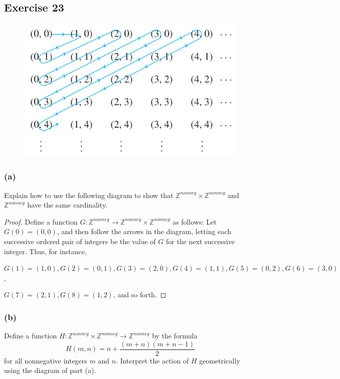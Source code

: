 \documentclass[14pt]{extarticle}
\newcommand{\Z}{\mathbb{Z}}
\begin{document}
\subsection{Exercise 23}
\begin{figure}[ht!]
\centering
\includegraphics[scale=0.5]{../images/7.4.23.a.png}
\end{figure}

\subsubsection{(a)}
Explain how to use the following diagram to show that \(\Z^{nonneg} \times \Z^{nonneg}\) and \(\Z^{nonneg}\) have 
the same cardinality.

\begin{proof}
Define a function \(G: \Z^{nonneg} \to \Z^{nonneg} \times \Z^{nonneg}\) as follows: Let \(G(0) = (0, 0)\), and then 
follow the arrows in the diagram, letting each successive ordered pair of integers be the value of $G$ for the next successive integer. Thus, for instance, 

\(G(1) = (1, 0), G(2) = (0, 1), G(3) = (2, 0), G(4) = (1, 1), G(5) = (0, 2), G(6) = (3, 0)\), 

\(G(7) = (2, 1), G(8) = (1, 2)\), and so forth.
\end{proof}

\subsubsection{(b)}
Define a function \(H: \Z^{nonneg} \times \Z^{nonneg} \to \Z^{nonneg}\) by the formula 
\[
H(m, n) = n + \frac{(m+n)(m+n-1)}{2}
\]
for all nonnegative integers $m$ and $n$. Interpret the action of $H$ geometrically using the diagram of part (a).
\end{document}
